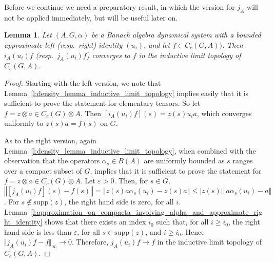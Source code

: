 \documentclass{amsart}
\theoremstyle{plain}
\newtheorem{lemma}[theorem]{Lemma}
\theoremstyle{definition}
\numberwithin{equation}{section}
\begin{document}
Before we continue we need a preparatory result, in which the version for $j_A$ will not be applied immediately, but will be useful later on.

\begin{lemma}\label{l:i_j_A_continuous_in_inductive}
 Let ${(A,G,\alpha)}$ be a Banach algebra dynamical system with a bounded approximate left \textup{(}resp.\ right\textup{)} identity $(u_i)$, and let $f \in C_c(G,A))$. Then $i_A(u_i)f$ \textup{(}resp.\ $j_A(u_i)f$\textup{)} converges to $f$ in the inductive limit topology of $C_c(G,A)$.
\end{lemma}

\begin{proof}
Starting with the left version, we note that Lemma~\ref{l:density_lemma_inductive_limit_topology} implies easily that it is sufficient to prove the statement for elementary tensors. So let $f = z \otimes a \in C_c(G) \otimes A$. Then $[i_A(u_i)f](s) = z(s) u_i a$, which converges uniformly to $z(s) a = f(s)$ on $G$.

As to the right version, again Lemma~\ref{l:density_lemma_inductive_limit_topology}, when combined with the observation that the operators $\alpha_s\in B(A)$ are uniformly bounded as $s$ ranges over a compact subset of $G$, implies that it is sufficient to prove the statement for $f = z \otimes a \in C_c(G) \otimes A$. Let ${\varepsilon} > 0$. Then, for $s\in G$, ${\left\Vert {[j_A(u_i)f](s)-f(s)} \right\Vert}={\left\Vert {z(s)a\alpha_s(u_i)-z(s)a} \right\Vert}\leq |z(s)|{\left\Vert {a\alpha_s(u_i)-a} \right\Vert}$. For $s\notin{\text{supp}}(z)$, the right hand side is zero, for all $i$. Lemma~\ref{l:approximation_on_compacta_involving_alpha_and_approximate_right_identity} shows that there exists an index $i_0$ such that, for all $i\geq i_0$, the right hand side is less than ${\varepsilon}$, for all $s\in {\text{supp}}(z)$, and $i\geq i_0$. Hence $\Vert j_A(u_i)f-f\Vert_\infty\to 0$. Therefore, $j_A(u_i)f \to f$ in the inductive limit topology of $C_c(G,A)$.
\end{proof}
\end{document}
